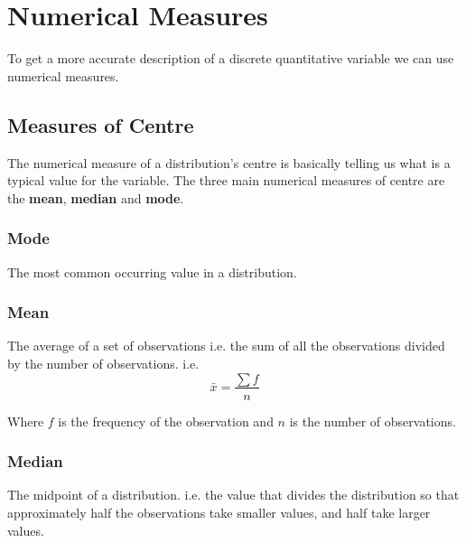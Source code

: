 \documentclass[12pt letter]{report}
\begin{document}

\section{Numerical Measures}

To get a more accurate description of a discrete quantitative variable we can use numerical measures.

\subsection{Measures of Centre}

The numerical measure of a distribution's centre is basically telling us what is a typical value for the variable. The three main numerical measures of centre are the \textbf{mean}, \textbf{median} and \textbf{mode}.

\subsubsection{Mode}

The most common occurring value in a distribution.

\subsubsection{Mean}

The average of a set of observations i.e. the sum of all the observations divided by the number of observations. i.e.
\[
	\bar{x} = \frac{\sum{f}}{n}
\]

Where $f$ is the frequency of the observation and $n$ is the number of observations.

\subsubsection{Median}

The midpoint of a distribution. i.e. the value that divides the distribution so that approximately half the observations take smaller values, and half take larger values.
\end{document}
